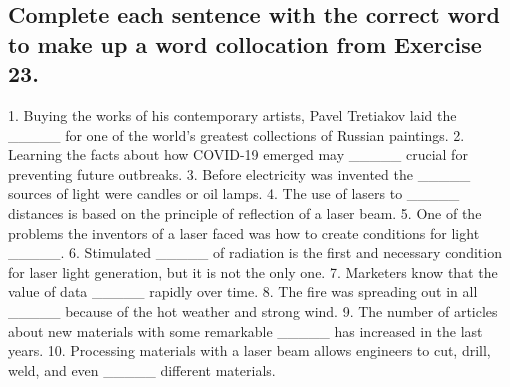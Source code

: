 \subsection*{Complete each sentence with the correct word to make up a word collocation
      from Exercise 23.}
1. Buying the works of his contemporary artists, Pavel Tretiakov laid the \_\_\_\_\_
for one of the world’s greatest collections of Russian paintings. 2. Learning the facts
about how COVID-19 emerged may \_\_\_\_\_ crucial for preventing future outbreaks. 3.
Before electricity was invented the \_\_\_\_\_ sources of light were candles or oil
lamps. 4. The use of lasers to \_\_\_\_\_ distances is based on the principle of
reflection of a laser beam. 5. One of the problems the inventors of a laser faced was
how to create conditions for light \_\_\_\_\_. 6. Stimulated \_\_\_\_\_ of radiation
is the first and necessary condition for laser light generation, but it is not the only
one. 7. Marketers know that the value of data \_\_\_\_\_ rapidly over time. 8. The
fire was spreading out in all \_\_\_\_\_ because of the hot weather and strong wind. 9.
The number of articles about new materials with some remarkable \_\_\_\_\_ has increased
in the last years. 10. Processing materials with a laser beam allows engineers to cut,
drill, weld, and even \_\_\_\_\_ different materials.

